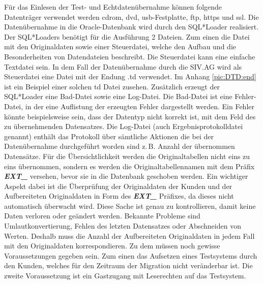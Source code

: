 Für das Einlesen der Test- und Echtdatenübernahme  können folgende Datenträger verwendet werden \acrshort{cdrom}, \acrshort{dvd}, \acrshort{usb}-Festplatte, \acrshort{ftp}, \acrshort{https} und \acrshort{ssl}. Die Datenübernahme in die Oracle-Datenbank wird durch den SQL*Loader realisiert. Der SQL*Loaders benötigt für die Ausführung 2 Dateien. Zum einen die Datei mit den Originaldaten sowie einer Steuerdatei, welche den Aufbau und die Besonderheiten von Datendateien beschreibt. Die Steuerdatei kann eine einfache Textdatei sein. In dem Fall der Datenübernahme durch die SIV.AG wird als Steuerdatei eine Datei mit der Endung .td verwendet. Im Anhang \ref{pic:DTD:end} ist ein Beispiel einer solchen \acrfull{td} Datei zusehen. Zusätzlich erzeugt der SQL*Loader eine Bad-Datei sowie eine Log-Datei. Die Bad-Datei ist eine Fehler-Datei, in der eine Auflistung der erzeugten Fehler dargestellt werden. Ein Fehler könnte beispielsweise sein, dass der Datentyp nicht korrekt ist, mit dem Feld des zu übernehmenden Datensatzes. Die Log-Datei (auch Ergebnisprotokolldatei genannt) enthält das Protokoll über sämtliche Aktionen die bei der Datenübernahme durchgeführt worden sind z.\,B. Anzahl der übernommen Datensätze. Für die Übersichtlichkeit werden die Originaltabellen nicht eins zu eins übernommen, sondern es werden die Originaltabellennamen mit dem Präfix \textit{\textbf{EXT\_}} versehen, bevor sie in die Datenbank geschoben werden. Ein wichtiger Aspekt dabei ist die Überprüfung der Originaldaten der Kunden und der Aufbereiteten Originaldaten in Form des \textit{\textbf{EXT\_}} Präfixes, da dieses nicht automatisch überwacht wird. Diese Sache ist genau zu kontrollieren, damit keine Daten verloren oder geändert werden. Bekannte Probleme sind Umlautkonvertierung, Fehlen des letzten Datensatzes oder Abschneiden von Werten. Deshalb muss die Anzahl der Aufbereiteten Originaldaten in jedem Fall mit den Originaldaten korrespondieren. Zu dem müssen noch gewisse Voraussetzungen gegeben sein. Zum einen das Aufsetzen eines Testsystems durch den Kunden, welches für den Zeitraum der Migration nicht veränderbar ist. Die zweite Voraussetzung ist ein Gastzugang mit Leserechten auf das Testsystem.

